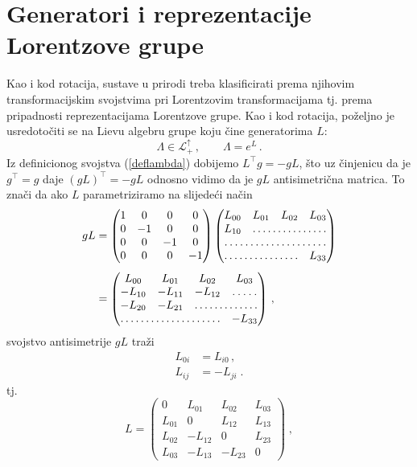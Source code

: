 \section{Generatori i reprezentacije Lorentzove grupe}

\label{id:5}
Kao i kod rotacija, sustave u prirodi treba klasificirati prema
njihovim transformacijskim svojstvima pri Lorentzovim transformacijama
tj. prema pripadnosti reprezentacijama Lorentzove
grupe. Kao i kod rotacija, poželjno je usredotočiti se na Lievu algebru
grupe koju čine generatorima $L$:
\begin{equation}
 \Lambda \in \mathcal{L}^{\uparrow}_{+}\,, \qquad \Lambda = e^L \,.
\end{equation}
Iz definicionog svojstva (\ref{deflambda}) dobijemo $L^\top g = -g L$,
što uz činjenicu da je $g^\top = g$ daje $(gL)^\top = -gL$ odnosno
vidimo da je $gL$ antisimetrična matrica. To znači da ako $L$
parametriziramo na slijedeći način
\begin{align}
 gL &= 
\begin{pmatrix}
1 & 0 & 0 & 0 \\
0 &-1 & 0 & 0 \\
0 & 0 &-1 & 0 \\
0 & 0 & 0 &-1
\end{pmatrix}
\begin{pmatrix}
L_{00} & L_{01} & L_{02} & L_{03}\\
L_{10} &\hdotsfor{3} \\
\hdotsfor{4} \\
\hdotsfor{3} & L_{33}
\end{pmatrix} \\[1ex]
&= 
\begin{pmatrix}
L_{00} & L_{01} & L_{02} & L_{03}\\
-L_{10} & -L_{11} & -L_{12} &\hdotsfor{1} \\
-L_{20} & -L_{21} & \hdotsfor{2} \\
\hdotsfor{3} & -L_{33}
\end{pmatrix} \,,
\end{align}
svojstvo antisimetrije $gL$ traži
\begin{align}
L_{0i} &= L_{i0} \,, \\
L_{ij} &= - L_{ji} \;.
\end{align}
tj.
\begin{equation}
 L = \begin{pmatrix}
0 & L_{01} & L_{02} & L_{03}\\
L_{01} & 0 & L_{12} & L_{13}\\
L_{02} & -L_{12} & 0& L_{23} \\
L_{03} & -L_{13} &-L_{23} & 0
\end{pmatrix} \;,
\end{equation}
